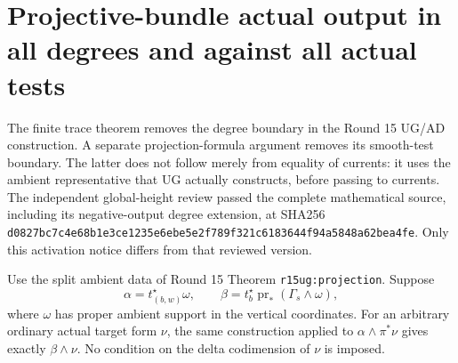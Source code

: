 \section{Projective-bundle actual output in all degrees and against all actual tests}
\label{r16out:section}

The finite trace theorem removes the degree boundary in the Round 15
UG/AD construction.  A separate projection-formula argument removes
its smooth-test boundary.  The latter does not follow merely from
equality of currents: it uses the ambient representative that UG
actually constructs, before passing to currents.
The independent global-height review passed the complete mathematical
source, including its negative-output degree extension, at SHA256
\texttt{d0827bc7c4e68b1e3ce1235e6ebe5e2f789f321c6183644f94a5848a62bea4fe}.
Only this activation notice differs from that reviewed version.

\begin{lemma}
\label{r16out:target-factor}
Use the split ambient data of Round 15 Theorem \texttt{r15ug:projection}.
Suppose
\[
 \alpha=t_{(b,w)}^\star\omega,\qquad
 \beta=t_b^\star\operatorname{pr}_*(\Gamma_s\wedge\omega),
 \tag{OUT16.1}\label{r16out:local-output}
\]
where $\omega$ has proper ambient support in the vertical coordinates.
For an arbitrary ordinary actual target form $\nu$, the same construction
applied to $\alpha\wedge\pi^*\nu$ gives exactly $\beta\wedge\nu$.
No condition on the delta codimension of $\nu$ is imposed.
\end{lemma}

